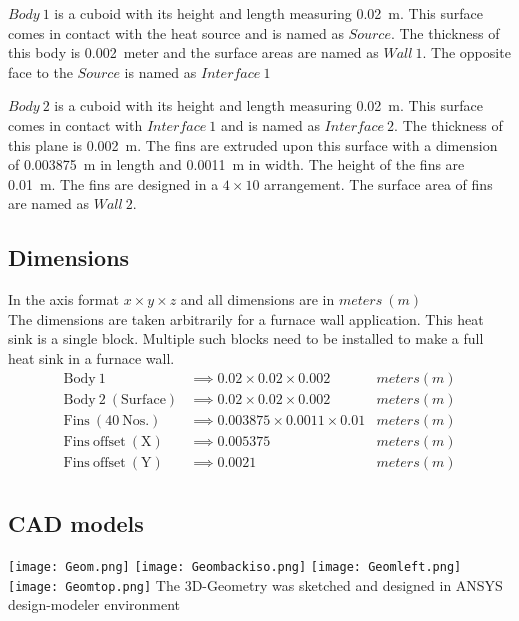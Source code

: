 \documentclass[twoside]{article}
\begin{document}
$Body\ 1$ is a cuboid with its height and length measuring \SI{0.02}{\meter}. This surface comes in contact with the heat source and is named as $Source$. The thickness of this body is \SI{0.002}{meter} and the surface areas are named as $Wall\ 1$. The opposite face to the $Source$ is named as $Interface\ 1$

$Body\ 2$ is a cuboid with its height and length measuring \SI{0.02}{\meter}. This surface comes in contact with $Interface\ 1$ and is named as $Interface\ 2$. The thickness of this plane is \SI{0.002}{m}. The fins are extruded upon this surface with a dimension of \SI{0.003875}{\meter} in length and \SI{0.0011}{\meter} in width. The height of the fins are \SI{0.01}{\meter}. The fins are designed in a $4 \times 10$ arrangement. The surface area of fins are named as $Wall\ 2$. 

\subsection{Dimensions} 
In the axis format $x \times y \times z$ and all dimensions are in $meters\ (m)$ \\
The dimensions are taken arbitrarily for a furnace wall application. This heat sink is a single block. Multiple such blocks need to be installed to make a full heat sink in a furnace wall. 
\begin{align*}
    \mathrm{Body\ 1} & \implies 0.02 \times 0.02 \times 0.002 & meters (m) \\
    \mathrm{Body\ 2\ (Surface)} & \implies 0.02 \times 0.02 \times 0.002 & meters (m) \\
    \mathrm{Fins\ (40\ Nos.)} & \implies 0.003875 \times 0.0011 \times 0.01 & meters (m) \\
    \mathrm{Fins\ offset\ (X)} & \implies 0.005375 & meters (m) \\
    \mathrm{Fins\ offset\ (Y)} & \implies 0.0021 & meters (m) \\
\end{align*}

\subsection{CAD models}
\vspace{1.5cm}
\begin{center}
    \texttt{[image: Geom.png]}
    \vspace{5cm}
    \texttt{[image: Geombackiso.png]}
    \newpage
    \texttt{[image: Geomleft.png]}
    \vspace{5cm}
    \texttt{[image: Geomtop.png]}
    \vspace{2cm}
    \scriptsize{The 3D-Geometry was sketched and designed in ANSYS design-modeler environment}
\end{center}
\end{document}

